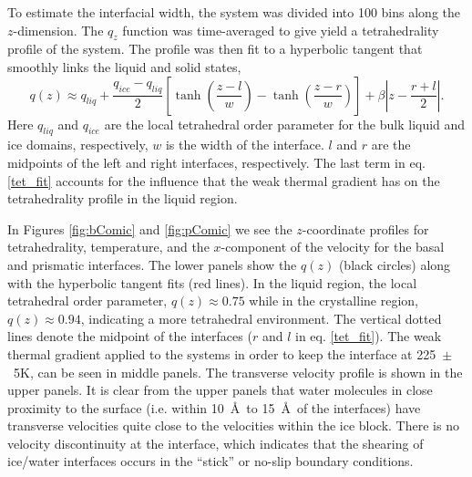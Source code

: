 \documentclass[11pt]{article}
\begin{document}
\begin{doublespace}
To estimate the interfacial width, the system was divided into 100
bins along the $z$-dimension.  The $q_{z}$ function was time-averaged
to give yield a tetrahedrality profile of the system. The profile was
then fit to a hyperbolic tangent that smoothly links the liquid and
solid states,
\begin{equation}\label{tet_fit}
q(z) \approx
q_{liq}+\frac{q_{ice}-q_{liq}}{2}\left[\tanh\left(\frac{z-l}{w}\right)-\tanh\left(\frac{z-r}{w}\right)\right]+\beta\left|z-
\frac{r+l}{2}\right|.
\end{equation}
Here $q_{liq}$ and $q_{ice}$ are the local tetrahedral order parameter
for the bulk liquid and ice domains, respectively, $w$ is the width of
the interface.  $l$ and $r$ are the midpoints of the left and right
interfaces, respectively.  The last term in eq. \eqref{tet_fit}
accounts for the influence that the weak thermal gradient has on the
tetrahedrality profile in the liquid region. 

In Figures \ref{fig:bComic} and \ref{fig:pComic} we see the
$z$-coordinate profiles for tetrahedrality, temperature, and the
$x$-component of the velocity for the basal and prismatic interfaces.
The lower panels show the $q(z)$ (black circles) along with the
hyperbolic tangent fits (red lines). In the liquid region, the local
tetrahedral order parameter, $q(z) \approx 0.75$ while in the
crystalline region, $q(z) \approx 0.94$, indicating a more tetrahedral
environment.  The vertical dotted lines denote the midpoint of the
interfaces ($r$ and $l$ in eq. \eqref{tet_fit}). The weak thermal
gradient applied to the systems in order to keep the interface at
225~$\pm$~5K, can be seen in middle panels.  The transverse velocity
profile is shown in the upper panels.  It is clear from the upper
panels that water molecules in close proximity to the surface (i.e.
within 10~\AA\ to 15~\AA~of the interfaces) have transverse velocities
quite close to the velocities within the ice block.  There is no
velocity discontinuity at the interface, which indicates that the
shearing of ice/water interfaces occurs in the ``stick'' or no-slip
boundary conditions.


\end{doublespace}
\end{document}
